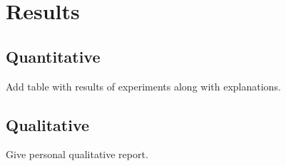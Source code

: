 \chapter{Results} \label{ch:ch5}

\section{Quantitative}
Add table with results of experiments along with explanations.

\section{Qualitative}
Give personal qualitative report. 